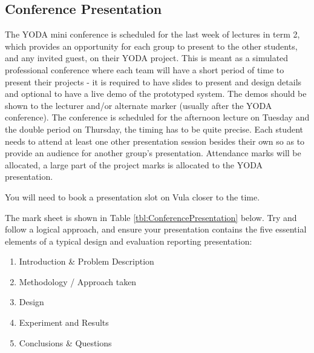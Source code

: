 \subsection{Conference Presentation}
\label{ms:conferencepresentation}
The YODA mini conference is scheduled for the last week of lectures in term 2, which provides an opportunity for each group to present to the other students, and any invited guest, on their YODA project. This is meant as a simulated professional conference where each team will have a short period of time to present their projects - it is required to have slides to present and design details and optional to have a live demo of the prototyped system. The demos should be shown to the lecturer and/or alternate marker (usually after the YODA conference). The conference is scheduled for the afternoon lecture on Tuesday and the double period on Thursday, the timing has to be quite precise. Each student needs to attend at least one other presentation session besides their own so as to provide an audience for another group's presentation. Attendance marks will be allocated, a large part of the project marks is allocated to the YODA presentation.

You will need to book a presentation slot on Vula closer to the time.

The mark sheet is shown in Table \ref{tbl:ConferencePresentation} below. Try and follow a logical approach, and ensure your presentation contains the five essential elements of a typical design and evaluation reporting presentation:
\begin{enumerate}
    \item Introduction \& Problem Description
    \item Methodology / Approach taken
    \item Design
    \item Experiment and Results
    \item Conclusions \& Questions
\end{enumerate}

